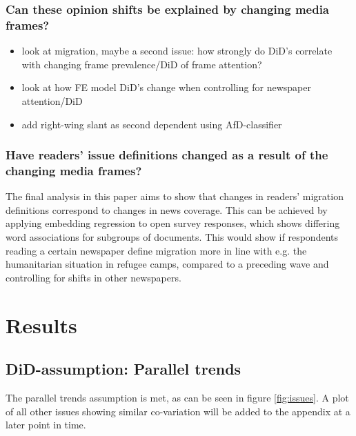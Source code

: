 \documentclass{article}
\begin{document}
\subsubsection{Can these opinion shifts be explained by changing media frames?}

\begin{itemize}
    \item look at migration, maybe a second issue: how strongly do DiD's correlate with changing frame prevalence/DiD of frame attention?
    \item look at how FE model DiD's change when controlling for newspaper attention/DiD
    \item add right-wing slant as second dependent using AfD-classifier
\end{itemize}

\subsubsection{Have readers' issue definitions changed as a result of the changing media frames?}

The final analysis in this paper aims to show that changes in readers' migration definitions correspond to changes in news coverage. This can be achieved by applying embedding regression to open survey responses, which shows differing word associations for subgroups of documents. This would show if respondents reading a certain newspaper define migration more in line with e.g. the humanitarian situation in refugee camps, compared to a preceding wave and controlling for shifts in other newspapers.

\section{Results}

\subsection{DiD-assumption: Parallel trends}

The parallel trends assumption is met, as can be seen in figure \ref{fig:issues}. A plot of all other issues showing similar co-variation will be added to the appendix at a later point in time.
    
\end{document}
